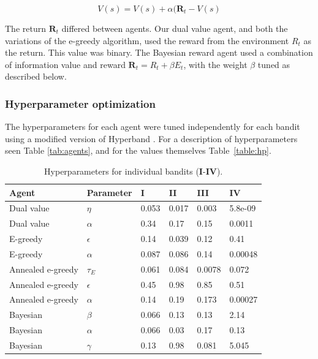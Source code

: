 \begin{equation}
	\label{eq:TD}
	V(s) = V(s) + \alpha (\mathbf{R}_t - V(s)
\end{equation}

The return $\mathbf{R}_t$ differed between agents. Our dual value agent, and both the variations of the e-greedy algorithm, used the reward from the environment $R_t$ as the return. This value was binary. The Bayesian reward agent used a combination of information value and reward $\mathbf{R}_t = R_t + \beta E_t$, with the weight $\beta$ tuned as described below. 

\subsubsection*{Hyperparameter optimization}
The hyperparameters for each agent were tuned independently for each bandit using a modified version of Hyperband \cite{Li2016a}. For a description of hyperparameters seen Table \ref{tab:agents}, and for the values themselves Table~\ref{table:hp}.

\begin{table}[]
\caption{Hyperparameters for individual bandits (\textbf{I}-\textbf{IV}).}
\label{tab:hp}
\begin{tabular}{|l|l|l|l|l|l|}
\hline
\textbf{Agent} & \textbf{Parameter} & \textbf{I} & \textbf{II} & \textbf{III} & \textbf{IV} \\ \hline
Dual value & $\eta$ & 0.053 & 0.017 & 0.003 & 5.8e-09 \\ \hline
Dual value & $\alpha$ & 0.34 & 0.17 & 0.15 & 0.0011 \\ \hline
E-greedy & $\epsilon$ & 0.14 & 0.039 & 0.12 & 0.41 \\ \hline
E-greedy & $\alpha$ & 0.087 & 0.086 & 0.14 & 0.00048 \\ \hline
Annealed e-greedy & $\tau_E$ & 0.061 & 0.084 & 0.0078 & 0.072 \\ \hline
Annealed e-greedy & $\epsilon$ & 0.45 & 0.98 & 0.85 & 0.51 \\ \hline
Annealed e-greedy & $\alpha$ & 0.14 & 0.19 & 0.173 & 0.00027 \\ \hline
Bayesian & $\beta$ & 0.066 & 0.13 & 0.13 & 2.14 \\ \hline
Bayesian & $\alpha$ & 0.066 & 0.03 & 0.17 & 0.13 \\ \hline
Bayesian & $\gamma$ & 0.13 & 0.98 & 0.081 & 5.045 \\ \hline
\end{tabular}
\end{table}


